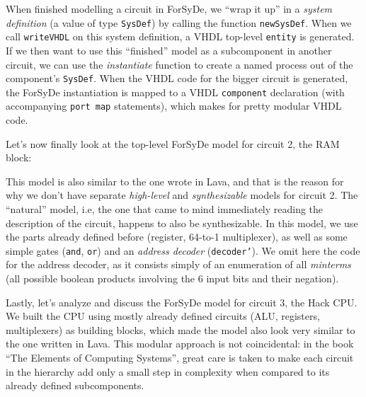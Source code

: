 \documentclass[a4paper]{article}
\begin{document}
                When finished modelling a circuit in ForSyDe, we ``wrap it up''
                in a \emph{system definition} (a value of type \texttt{SysDef}) by calling the
                function \texttt{newSysDef}. When we call \texttt{writeVHDL} on this system
                definition, a VHDL top-level \texttt{entity} is generated. If we then want to use
                this ``finished'' model as a subcomponent in another circuit, we can use the
                \emph{instantiate} function to create a named process out of the component's
                \texttt{SysDef}. When the VHDL code for the bigger circuit is generated, the ForSyDe
                instantiation is mapped to a VHDL \texttt{component} declaration (with accompanying
                \texttt{port map} statements), which makes for pretty modular VHDL code.

                Let's now finally look at the top-level ForSyDe model for circuit 2, the RAM block:


                This model is also similar to the one wrote in Lava, and that is the
                reason for why we don't have separate \emph{high-level} and \emph{synthesizable}
                models for circuit 2. The ``natural'' model, i.e, the one that came to mind
                immediately reading the description of the circuit, happens to also be
                synthesizable. In this model, we use the parts already defined before (register,
                64-to-1 multiplexer), as well as some simple gates (\texttt{and}, \texttt{or}) and
                an \emph{address decoder} (\texttt{decoder'}). We omit here the code for the address
                decoder, as it consists simply of an enumeration of all \emph{minterms} (all
                possible boolean products involving the 6 input bits and their negation).

                Lastly, let's analyze and discuss the ForSyDe model for circuit 3, the Hack CPU. We
                built the CPU using mostly already defined circuits (ALU, registers, multiplexers)
                as building blocks, which made the model also look very similar to the one written
                in Lava. This modular approach is not coincidental: in the book ``The Elements of
                Computing Systems''\cite{nand2tetris-book}, great care is taken to make each circuit
                in the hierarchy add only a small step in complexity when compared to its already
                defined subcomponents.
\end{document}
